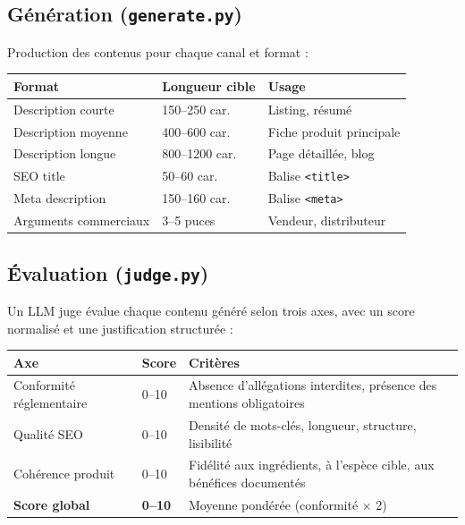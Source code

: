 \documentclass[11pt,a4paper]{article}
\begin{document}
\subsection{Génération (\texttt{generate.py})}

Production des contenus pour chaque canal et format :

\begin{center}
\renewcommand{\arraystretch}{1.3}
\begin{tabular}{lll}
\toprule
\textbf{Format} & \textbf{Longueur cible} & \textbf{Usage} \\
\midrule
Description courte  & 150–250 car. & Listing, résumé \\
Description moyenne & 400–600 car. & Fiche produit principale \\
Description longue  & 800–1200 car. & Page détaillée, blog \\
SEO title           & 50–60 car.   & Balise \texttt{<title>} \\
Meta description    & 150–160 car. & Balise \texttt{<meta>} \\
Arguments commerciaux & 3–5 puces  & Vendeur, distributeur \\
\bottomrule
\end{tabular}
\end{center}

\subsection{Évaluation (\texttt{judge.py})}

Un LLM juge évalue chaque contenu généré selon trois axes, avec un score normalisé et
une justification structurée :

\begin{center}
\renewcommand{\arraystretch}{1.3}
\begin{tabular}{llp{7cm}}
\toprule
\textbf{Axe} & \textbf{Score} & \textbf{Critères} \\
\midrule
Conformité réglementaire & 0–10 &
  Absence d'allégations interdites, présence des mentions obligatoires \\
Qualité SEO & 0–10 &
  Densité de mots-clés, longueur, structure, lisibilité \\
Cohérence produit & 0–10 &
  Fidélité aux ingrédients, à l'espèce cible, aux bénéfices documentés \\
\midrule
\textbf{Score global} & \textbf{0–10} & Moyenne pondérée (conformité $\times$ 2) \\
\bottomrule
\end{tabular}
\end{center}
\end{document}
